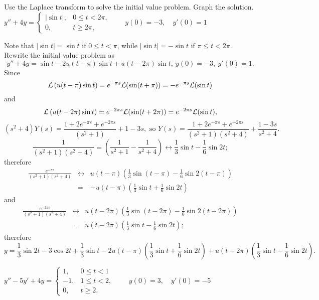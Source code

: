 \documentclass{ximera}
\begin{document}
\begin{problem}\label{exer:8.5.6} Use the Laplace transform to solve the initial value problem.  Graph the solution. 
$y''+4y= \left\{\begin{array}{cl}|\sin
t|,&0\le t<2\pi,\\ 0,&t\ge 2\pi,\end{array}\right.\qquad
y(0)=-3,\quad y'(0)=1$

\begin{solution}
Note that $|\sin t|=\sin t$ if $0\le t<\pi$, while
 $|\sin t|=-\sin t$ if $\pi\le t<2\pi$. Rewrite the initial value
problem as
$$
y''+4y=\sin t-2u(t-\pi)\sin t+u(t-2\pi)\sin t,\ y(0)=-3,\ y'(0)=1.
$$
Since
$$
{\cal L}\left(u(t-\pi)\sin t\right)=e^{-\pi s}{\cal
L}(\sin(t+\pi))=-e^{-\pi s}{\cal L}(\sin t)
$$
 and
$$
{\cal L}\left(u(t-2\pi)\sin t\right)=e^{-2\pi s}{\cal
L}(\sin(t+2\pi))=e^{-2\pi s}{\cal L}(\sin t),
$$
$$
(s^2+4)Y(s)=\frac{1+2e^{-\pi s}+e^{-2\pi s}}{(s^2+1)}+1-3s,\mbox{ so }
Y(s)=\frac{1+2e^{-\pi s}+e^{-2\pi
s}}{(s^2+1)(s^2+4)}+\frac{1-3s}{s^2+4}.
$$
$$
\frac{1}{(s^2+1)(s^2+4)}=\left(\frac{1}{s^2+1}-\frac{1}{s^2+4}\right)
\leftrightarrow \frac{1}{3}\sin t-\frac{1}{6}\sin2t;
$$
therefore
\begin{eqnarray*}
\frac{e^{-\pi s}}{(s^2+1)(s^2+4)}
&\leftrightarrow&
u(t-\pi)\left(\frac{1}{3}\sin(t-\pi)-\frac{1}{6}\sin2(t-\pi)\right)\\
&=&-u(t-\pi)\left(\frac{1}{3}\sin t+\frac{1}{6}\sin2t\right)
\end{eqnarray*}
and
\begin{eqnarray*}
\frac{e^{-2\pi s}}{(s^2+1)(s^2+4)}
&\leftrightarrow&
u(t-2\pi)\left(\frac{1}{3}\sin(t-2\pi)-\frac{1}{6}\sin2(t-2\pi)\right)\\
&=&u(t-2\pi)\left(\frac{1}{3}\sin t-\frac{1}{6}\sin2t\right);
\end{eqnarray*}
therefore
$$
y=\frac{1}{3}\sin2t-3\cos2t+\frac{1}{3}\sin t
- 2 u(t-\pi)\left(\frac{1}{3}\sin t+\frac{1}{6}\sin2t\right)
+u(t-2\pi)\left(\frac{1}{3}\sin
t-\frac{1}{6}\sin2t\right).
$$
\end{solution}
\end{problem}

\begin{problem}\label{exer:8.5.7} $y''-5y'+4y= \left\{\begin{array}{rl} 1,&0\le
t<1\\ -1,&1\le t<2,\\ 0,&t\ge 2,\end{array}\right.\qquad
y(0)=3,\quad y'(0)=-5$
\end{problem}
\end{document}
